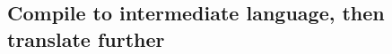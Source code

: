 \subsection{Compile to intermediate language, then translate further}
\label{sec:compiletointermediate}
